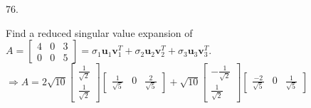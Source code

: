\documentclass[12pt]{book}
\begin{document}
\begin{CJK}{UTF8}{bsmi}
76. \begin{minipage}[t]{\dimexpr\linewidth-2em}
Find a reduced singular value expansion of $A=\begin{bmatrix}
4&0&3\\0&0&5
\end{bmatrix}=\sigma_1\textbf{u}_1\textbf{v}_1^T+\sigma_2\textbf{u}_2\textbf{v}_2^T+\sigma_3\textbf{u}_3\textbf{v}_3^T$. \\
$\Rightarrow A=2\sqrt{10}\begin{bmatrix}
\frac{1}{\sqrt{2}} \\ \frac{1}{\sqrt{2}}
\end{bmatrix}\begin{bmatrix}
\frac{1}{\sqrt{5}} & 0 &\frac{2}{\sqrt{5}}
\end{bmatrix}+\sqrt{10}\begin{bmatrix}
-\frac{1}{\sqrt{2}} \\ \frac{1}{\sqrt{2}}
\end{bmatrix}\begin{bmatrix}
\frac{-2}{\sqrt{5}} & 0 &\frac{1}{\sqrt{5}}
\end{bmatrix}$
\end{minipage}\\

\end{CJK}
\end{document}
